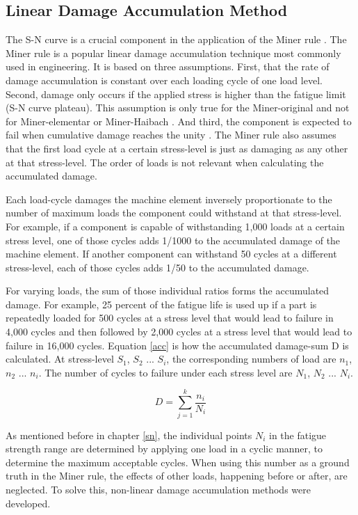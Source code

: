 \subsection{Linear Damage Accumulation Method}\label{LAD}
The S-N curve is a crucial component in the application of the Miner rule \cite{MinerOG, Subramanyan}. The Miner rule is a popular linear damage accumulation technique most commonly used in engineering. It is based on three assumptions. First, that the rate of damage accumulation is constant over each loading cycle of one load level. Second, damage only occurs if the applied stress is higher than the fatigue limit (S-N curve plateau). This assumption is only true for the Miner-original and not for Miner-elementar or Miner-Haibach \cite{Werner}. And third, the component is expected to fail when cumulative damage reaches the unity \cite{Zuo}.
The Miner rule also assumes that the first load cycle at a certain stress-level is just as damaging as any other at that stress-level. The order of loads is not relevant when calculating the accumulated damage.

Each load-cycle damages the machine element inversely proportionate to the number of maximum loads the component could withstand at that stress-level. For example, if a component is capable of withstanding 1,000 loads at a certain stress level, one of those cycles adds 1/1000 to the accumulated damage of the machine element.
If another component can withstand 50 cycles at a different stress-level, each of those cycles adds 1/50 to the accumulated damage.

For varying loads, the sum of those individual ratios forms the accumulated damage. 
For example, 25 percent of the fatigue life is used up if a part is repeatedly loaded for 500 cycles at a stress level that would lead to failure in 4,000 cycles and then followed by 2,000 cycles at a stress level that would lead to failure in 16,000 cycles.
Equation \ref{acc} is how the accumulated damage-sum D is calculated. At stress-level \(S_1\), \(S_2\) ... \(S_i\), the corresponding numbers of load are \(n_1\), \(n_2\) ... \(n_i\). The number of cycles to failure under each stress level are \(N_1\), \(N_2\) ... \(N_i\).

\begin{equation}\label{acc}
	D = \sum_{j=1}^{k}\frac{n_i}{N_i}
\end{equation}

As mentioned before in chapter \ref{sn}, the individual points \(N_i\) in the fatigue strength range are determined by applying one load in a cyclic manner, to determine the maximum acceptable cycles. When using this number as a ground truth in the Miner rule, the effects of other loads, happening before or after, are neglected. To solve this, non-linear damage accumulation methods were developed.


